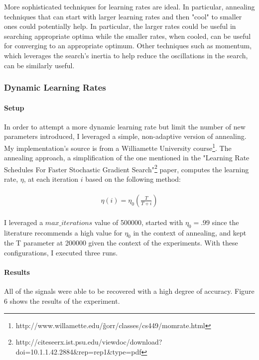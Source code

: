 \documentclass{article} %
\begin{document}
More sophisticated techniques for learning rates are ideal. In particular, annealing techniques that can start with larger learning rates and then "cool" to smaller ones could potentially help. In particular, the larger rates could be useful in searching appropriate optima while the smaller rates, when cooled, can be useful for converging to an appropriate optimum. Other techniques such as momentum, which leverages the search's inertia to help reduce the oscillations in the search, can be similarly useful.

\subsubsection{Dynamic Learning Rates}

\paragraph{Setup}

In order to attempt a more dynamic learning rate but limit the number of new parameters introduced, I leveraged a simple, non-adaptive version of annealing. My implementation's source is from a Williamette University course\footnote{http://www.willamette.edu/\~gorr/classes/cs449/momrate.html}. The annealing approach, a simplification of the one mentioned in the "Learning Rate Schedules For Faster Stochastic
Gradient Search"\footnote{http://citeseerx.ist.psu.edu/viewdoc/download?doi=10.1.1.42.2884\&rep=rep1\&type=pdf} paper, computes the learning rate, \(\eta\), at each iteration \(i\) based on the following method:

\begin{align*} 
\begin{split}
\eta(i) = \eta_0 (\frac{T}{T+i})
\end{split}					
\end{align*}

I leveraged a \(max\_iterations\) value of 500000, started with \(\eta_0=.99\) since the literature recommends a high value for \(\eta_0\) in the context of annealing, and kept the T parameter at 200000 given the context of the experiments. With these configurations, I executed three runs.

\paragraph{Results}

All of the signals were able to be recovered with a high degree of accuracy. Figure 6 shows the results of the experiment.
\end{document}
